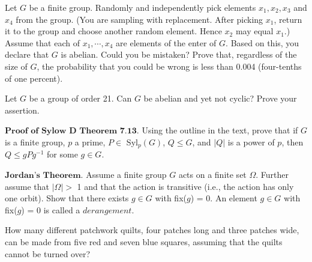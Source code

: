 \documentclass[12pt,letterpaper,boxed]{hmcpset}
\begin{document}

\begin{problem}[5.4.8]
Let $G$ be a finite group. Randomly and independently pick elements $x_1, x_2, x_3$ and $x_4$ from the group. (You are sampling with replacement. After picking $x_1$, return it to the group and choose another random element. Hence $x_2$ may equal $x_1$.) Assume that each of $ x_1,\cdots , x_4$ are elements of the enter of $G$. Based on this, you declare that $G$ is abelian. Could you be mistaken? Prove that, regardless of the size of $G$, the probability that you could be wrong is less than 0.004 (four-tenths of one percent). 
\end{problem}

\begin{solution}

\end{solution}

\clearpage

\begin{problem}[7.2.8]
Let $G$ be a group of order 21. Can $G$ be abelian and yet not cyclic? Prove your assertion. 
\end{problem}

\begin{solution}
\end{solution}

\clearpage

\begin{problem}[7.3.1]
$\textbf{Proof of Sylow D Theorem 7.13.}$ Using the outline in the text, prove that if $G$ is a finite group, $p$ a prime, $ P \in $ Syl$_p(G)$, $ Q \leq G$, and $ \vert Q \vert $ is a power of $p$, then $ Q \leq gPg^{-1} $ for some $g \in G$. 
\end{problem}

\begin{solution}
\end{solution}

\clearpage

\begin{problem}[8.1.4]
$\textbf{Jordan's Theorem.}$ Assume a finite group $G$ acts on a finite set $\Omega$. Further assume that $ | \Omega | >$ 1 and that the action is transitive (i.e., the action has only one orbit). Show that there exists $ g \in G $ with fix($g$) = 0. \newline
\hangindent=1cm An element $ g \in G $ with fix($g$) = 0 is called a $\textit{derangement}$.
\end{problem}

\begin{solution}
\end{solution}

\clearpage


\begin{problem}[8.2.2]
How many different patchwork quilts, four patches long and three patches wide, can be made from five red and seven blue squares, assuming that the quilts cannot be turned over?
\end{problem}

\begin{solution}
\end{solution}
\end{document}

